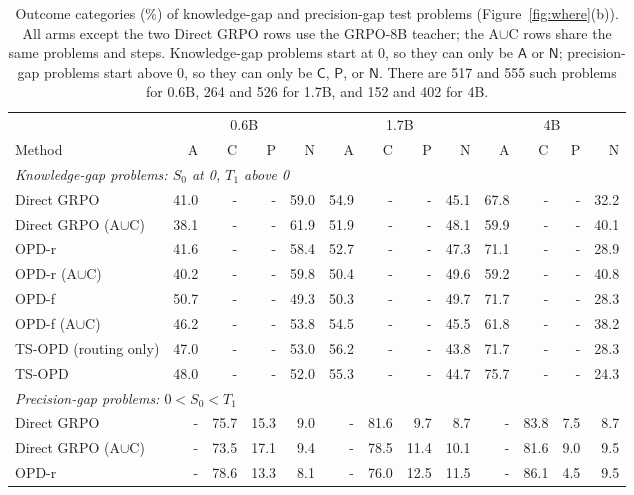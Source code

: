 \documentclass[10pt]{article}
\newcommand{\AC}{A$\cup$C}
\newcommand{\tA}{\mathsf{A}}
\newcommand{\tC}{\mathsf{C}}
\newcommand{\tP}{\mathsf{P}}
\newcommand{\tN}{\mathsf{N}}
\begin{document}
\begin{table}[h]
\end{table}

\begin{table}[h]
\centering
\scriptsize
\setlength{\tabcolsep}{3.5pt}
\caption{Outcome categories (\%) of knowledge-gap and precision-gap test
problems (Figure~\ref{fig:where}(b)). All arms except the two Direct GRPO rows use the
GRPO-8B teacher; the \AC{} rows share the same problems and steps. Knowledge-gap problems start at 0, so they can
only be $\tA$ or $\tN$; precision-gap problems start above 0, so they can only
be $\tC$, $\tP$, or $\tN$. There are 517 and 555 such problems for 0.6B, 264 and
526 for 1.7B, and 152 and 402 for 4B.}
\label{tab:rq4}
\begin{tabular}{lrrrrrrrrrrrr}
\toprule
 & \multicolumn{4}{c}{0.6B} & \multicolumn{4}{c}{1.7B} & \multicolumn{4}{c}{4B} \\
\cmidrule(lr){2-5}\cmidrule(lr){6-9}\cmidrule(lr){10-13}
Method & A & C & P & N & A & C & P & N & A & C & P & N \\
\midrule
\multicolumn{13}{l}{\textit{Knowledge-gap problems: $S_0$ at 0, $T_1$ above 0}} \\
Direct GRPO & 41.0 & - & - & 59.0 & 54.9 & - & - & 45.1 & 67.8 & - & - & 32.2 \\
Direct GRPO (A$\cup$C) & 38.1 & - & - & 61.9 & 51.9 & - & - & 48.1 & 59.9 & - & - & 40.1 \\
OPD-r & 41.6 & - & - & 58.4 & 52.7 & - & - & 47.3 & 71.1 & - & - & 28.9 \\
OPD-r (A$\cup$C) & 40.2 & - & - & 59.8 & 50.4 & - & - & 49.6 & 59.2 & - & - & 40.8 \\
OPD-f & 50.7 & - & - & 49.3 & 50.3 & - & - & 49.7 & 71.7 & - & - & 28.3 \\
OPD-f (A$\cup$C) & 46.2 & - & - & 53.8 & 54.5 & - & - & 45.5 & 61.8 & - & - & 38.2 \\
TS-OPD (routing only) & 47.0 & - & - & 53.0 & 56.2 & - & - & 43.8 & 71.7 & - & - & 28.3 \\
TS-OPD & 48.0 & - & - & 52.0 & 55.3 & - & - & 44.7 & 75.7 & - & - & 24.3 \\
\midrule
\multicolumn{13}{l}{\textit{Precision-gap problems: $0<S_0<T_1$}} \\
Direct GRPO & - & 75.7 & 15.3 & 9.0 & - & 81.6 & 9.7 & 8.7 & - & 83.8 & 7.5 & 8.7 \\
Direct GRPO (A$\cup$C) & - & 73.5 & 17.1 & 9.4 & - & 78.5 & 11.4 & 10.1 & - & 81.6 & 9.0 & 9.5 \\
OPD-r & - & 78.6 & 13.3 & 8.1 & - & 76.0 & 12.5 & 11.5 & - & 86.1 & 4.5 & 9.5 \\

\end{tabular}
\end{table}
\end{document}
